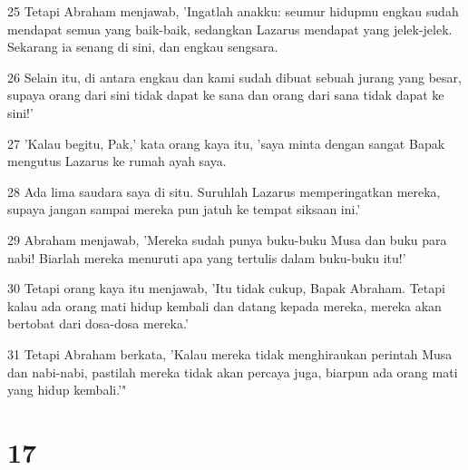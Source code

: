 \par 25 Tetapi Abraham menjawab, 'Ingatlah anakku: seumur hidupmu engkau sudah mendapat semua yang baik-baik, sedangkan Lazarus mendapat yang jelek-jelek. Sekarang ia senang di sini, dan engkau sengsara.
\par 26 Selain itu, di antara engkau dan kami sudah dibuat sebuah jurang yang besar, supaya orang dari sini tidak dapat ke sana dan orang dari sana tidak dapat ke sini!'
\par 27 'Kalau begitu, Pak,' kata orang kaya itu, 'saya minta dengan sangat Bapak mengutus Lazarus ke rumah ayah saya.
\par 28 Ada lima saudara saya di situ. Suruhlah Lazarus memperingatkan mereka, supaya jangan sampai mereka pun jatuh ke tempat siksaan ini.'
\par 29 Abraham menjawab, 'Mereka sudah punya buku-buku Musa dan buku para nabi! Biarlah mereka menuruti apa yang tertulis dalam buku-buku itu!'
\par 30 Tetapi orang kaya itu menjawab, 'Itu tidak cukup, Bapak Abraham. Tetapi kalau ada orang mati hidup kembali dan datang kepada mereka, mereka akan bertobat dari dosa-dosa mereka.'
\par 31 Tetapi Abraham berkata, 'Kalau mereka tidak menghiraukan perintah Musa dan nabi-nabi, pastilah mereka tidak akan percaya juga, biarpun ada orang mati yang hidup kembali.'"

\chapter{17}

